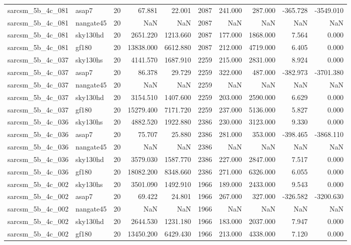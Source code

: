 \documentclass{article}
\begin{document}
\begin{longtable}{llrrrrrrrr}
sarcsm\_5b\_4c\_081 & asap7 & 20 & 67.881 & 22.001 & 2087 & 241.000 & 287.000 & -365.728 & -3549.010 \\
sarcsm\_5b\_4c\_081 & nangate45 & 20 & NaN & NaN & 2087 & NaN & NaN & NaN & NaN \\
sarcsm\_5b\_4c\_081 & sky130hd & 20 & 2651.220 & 1213.660 & 2087 & 177.000 & 1868.000 & 7.564 & 0.000 \\
sarcsm\_5b\_4c\_081 & gf180 & 20 & 13838.000 & 6612.880 & 2087 & 212.000 & 4719.000 & 6.405 & 0.000 \\
sarcsm\_5b\_4c\_037 & sky130hs & 20 & 4141.570 & 1687.910 & 2259 & 215.000 & 2831.000 & 8.924 & 0.000 \\
sarcsm\_5b\_4c\_037 & asap7 & 20 & 86.378 & 29.729 & 2259 & 322.000 & 487.000 & -382.973 & -3701.380 \\
sarcsm\_5b\_4c\_037 & nangate45 & 20 & NaN & NaN & 2259 & NaN & NaN & NaN & NaN \\
sarcsm\_5b\_4c\_037 & sky130hd & 20 & 3154.510 & 1407.600 & 2259 & 203.000 & 2590.000 & 6.629 & 0.000 \\
sarcsm\_5b\_4c\_037 & gf180 & 20 & 15279.400 & 7171.720 & 2259 & 237.000 & 5136.000 & 5.827 & 0.000 \\
sarcsm\_5b\_4c\_036 & sky130hs & 20 & 4882.520 & 1922.880 & 2386 & 230.000 & 3123.000 & 9.330 & 0.000 \\
sarcsm\_5b\_4c\_036 & asap7 & 20 & 75.707 & 25.880 & 2386 & 281.000 & 353.000 & -398.465 & -3868.110 \\
sarcsm\_5b\_4c\_036 & nangate45 & 20 & NaN & NaN & 2386 & NaN & NaN & NaN & NaN \\
sarcsm\_5b\_4c\_036 & sky130hd & 20 & 3579.030 & 1587.770 & 2386 & 227.000 & 2847.000 & 7.517 & 0.000 \\
sarcsm\_5b\_4c\_036 & gf180 & 20 & 18082.200 & 8348.660 & 2386 & 271.000 & 6326.000 & 6.055 & 0.000 \\
sarcsm\_5b\_4c\_002 & sky130hs & 20 & 3501.090 & 1492.910 & 1966 & 189.000 & 2433.000 & 9.543 & 0.000 \\
sarcsm\_5b\_4c\_002 & asap7 & 20 & 69.422 & 24.801 & 1966 & 267.000 & 327.000 & -326.582 & -3200.630 \\
sarcsm\_5b\_4c\_002 & nangate45 & 20 & NaN & NaN & 1966 & NaN & NaN & NaN & NaN \\
sarcsm\_5b\_4c\_002 & sky130hd & 20 & 2644.530 & 1231.180 & 1966 & 183.000 & 2037.000 & 7.947 & 0.000 \\
sarcsm\_5b\_4c\_002 & gf180 & 20 & 13450.200 & 6429.430 & 1966 & 213.000 & 4338.000 & 7.120 & 0.000 \\

\end{longtable}
\end{document}
